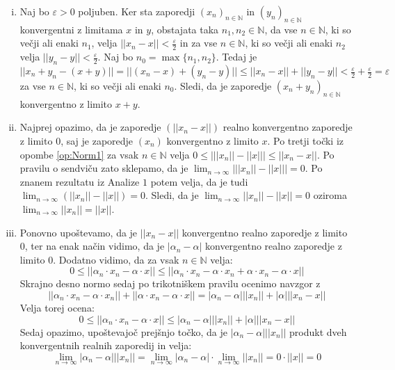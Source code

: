 \documentclass[mat2]{matdelo}
\newcommand{\N}{\mathbb{N}}
\newcommand{\abs}[1]{\ensuremath{\lvert #1 \rvert}}
\newcommand{\norm}[1]{\abs{\abs{#1}}}
\begin{document}
		\begin{dokaz}
			\begin{enumerate}[i)]
				\item Naj bo $\varepsilon > 0$ poljuben. Ker sta zaporedji $\left(x_n\right)_{n\in\N}$ in $\left(y_n\right)_{n\in\N}$ konvergentni z limitama $x$ in $y$, obstajata taka $n_1, n_2\in\N$, da vse $n\in\N$, ki so večji ali enaki $n_1$, velja $\norm{x_n - x} < \frac{\varepsilon}{2}$ in za vse $n\in\N$, ki so večji ali enaki $n_2$ velja $\norm{y_n - y} < \frac{\varepsilon}{2}$. Naj bo $n_0 = \max\{n_1, n_2\}$. Tedaj je $\norm{x_n + y_n - (x + y)} = \norm{(x_n - x) + (y_n - y)} \leq \norm{x_n - x} + \norm{y_n - y} < \frac{\varepsilon}{2} + \frac{\varepsilon}{2} = \varepsilon$ za vse $n\in\N$, ki so večji ali enaki $n_0$. Sledi, da je zaporedje $\left(x_n + y_n\right)_{n\in\N}$ konvergentno z limito $x + y$.
				\item Najprej opazimo, da je zaporedje $\left(\norm{x_n - x}\right)$ realno konvergentno zaporedje z limito $0$, saj je zaporedje $\left(x_n\right)$ konvergentno z limito $x$. Po tretji točki iz opombe \ref{op:Norm1} za vsak $n\in\N$ velja $0 \leq \abs{\norm{x_n} - \norm{x}} \leq \norm{x_n - x}$. Po pravilu o sendviču zato sklepamo, da je $\lim_{n\to\infty}\abs{\norm{x_n} - \norm{x}} = 0$. Po znanem rezultatu iz Analize $1$ potem velja, da je tudi $\lim_{n\to\infty}(\norm{x_n} - \norm{x}) = 0$. Sledi, da je $\lim_{n\to\infty}\norm{x_n} - \norm{x} = 0$ oziroma $\lim_{n\to\infty}\norm{x_n} = \norm{x}$.
				\item Ponovno upoštevamo, da je $\norm{x_n - x}$ konvergentno realno zaporedje z limito $0$, ter na enak način vidimo, da je $\abs{\alpha_n - \alpha}$ konvergentno realno zaporedje z limito $0$. Dodatno vidimo, da za vsak $n\in\N$ velja: $$0 \leq \norm{\alpha_n\cdot x_n - \alpha\cdot x} \leq \norm{\alpha_n\cdot x_n - \alpha\cdot x_n + \alpha\cdot x_n - \alpha\cdot x}$$
				Skrajno desno normo sedaj po trikotniškem pravilu ocenimo navzgor z $$\norm{\alpha_n\cdot x_n - \alpha\cdot x_n} + \norm{\alpha\cdot x_n - \alpha\cdot x}=\abs{\alpha_n - \alpha}\norm{x_n} + \abs{\alpha}\norm{x_n - x}$$ Velja torej ocena: \begin{equation}
					\label{eq:Normlim3}
					0 \leq \norm{\alpha_n\cdot x_n - \alpha\cdot x} \leq \abs{\alpha_n - \alpha}\norm{x_n} + \abs{\alpha}\norm{x_n - x}
				\end{equation}
				Sedaj opazimo, upoštevajoč prejšnjo točko, da je $\abs{\alpha_n - \alpha}\norm{x_n}$ produkt dveh konvergentnih realnih zaporedij in velja: $$\lim_{n\to\infty}\abs{\alpha_n - \alpha}\norm{x_n} = \lim_{n\to\infty}\abs{\alpha_n - \alpha} \cdot \lim_{n\to\infty}\norm{x_n} = 0\cdot\norm{x} = 0$$

\end{enumerate}
\end{dokaz}
\end{document}
